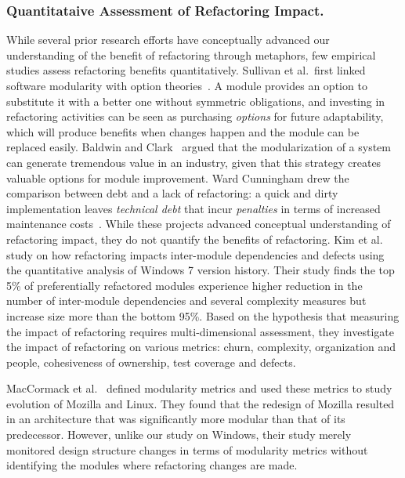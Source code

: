 \documentclass[runningheads,a4paper]{llncs}
\begin{document}
\subsubsection{Quantitataive Assessment of Refactoring Impact.} 
While several prior research efforts have conceptually advanced our understanding of the benefit of refactoring through metaphors, few empirical studies assess refactoring benefits quantitatively. Sullivan et al.~first linked software modularity with option theories~\cite{Sullivan1998:option}. A module provides an option to substitute it with a better one without symmetric obligations, and investing in refactoring activities can be seen as purchasing \emph{options} for future adaptability, which will produce benefits when changes happen and the module can be replaced easily. Baldwin and Clark~\cite{Baldwin1999:designrule} argued that the modularization of a system can generate tremendous value in an industry, given that this strategy creates valuable options for module improvement. Ward Cunningham drew the comparison between debt and a lack of refactoring: a quick and dirty implementation leaves {\em technical debt} that incur \emph{penalties} in terms of increased maintenance costs~\cite{Cunningham1992:td}. While these projects advanced conceptual understanding of refactoring impact, they do not quantify the benefits of refactoring.  Kim et al.~\cite{Kim2014:EmpiricalStudy} study on how refactoring impacts inter-module dependencies and defects using the quantitative analysis of Windows 7 version history. Their study finds the top 5\% of preferentially refactored modules experience higher reduction in the number of inter-module dependencies and several complexity measures but increase size more than the bottom 95\%. Based on the hypothesis that measuring the impact of refactoring requires multi-dimensional assessment, they investigate the impact of refactoring on various metrics: churn, complexity, organization and people, cohesiveness of ownership, test coverage and defects.     

MacCormack et al.~\cite{MacCormack2006:study} defined modularity metrics and used these metrics to study evolution of Mozilla and Linux. They found that the redesign of Mozilla resulted in an architecture that was significantly more modular than that of its predecessor. However, unlike our study on Windows, their study merely monitored design structure changes in terms of modularity metrics without identifying the modules where refactoring changes are made. 
\end{document}
